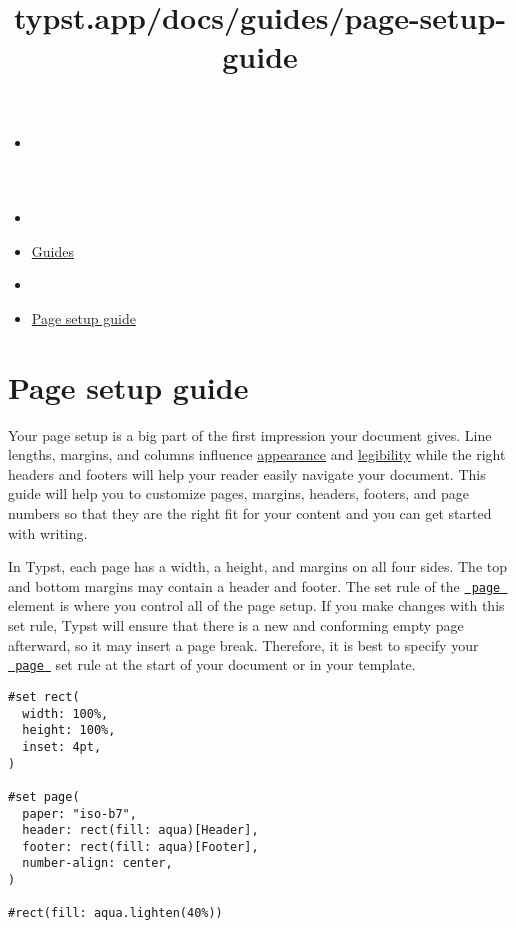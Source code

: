 \title{typst.app/docs/guides/page-setup-guide}

\begin{itemize}
\tightlist
\item
  \href{/docs}{}
\item
  
\item
  \href{/docs/guides/}{Guides}
\item
  
\item
  \href{/docs/guides/page-setup-guide/}{Page setup guide}
\end{itemize}

\section{Page setup guide}\label{page-setup-guide}

Your page setup is a big part of the first impression your document
gives. Line lengths, margins, and columns influence
\href{https://practicaltypography.com/page-margins.html}{appearance} and
\href{https://designregression.com/article/line-length-revisited-following-the-research}{legibility}
while the right headers and footers will help your reader easily
navigate your document. This guide will help you to customize pages,
margins, headers, footers, and page numbers so that they are the right
fit for your content and you can get started with writing.

In Typst, each page has a width, a height, and margins on all four
sides. The top and bottom margins may contain a header and footer. The
set rule of the \href{/docs/reference/layout/page/}{\texttt{\ page\ }}
element is where you control all of the page setup. If you make changes
with this set rule, Typst will ensure that there is a new and conforming
empty page afterward, so it may insert a page break. Therefore, it is
best to specify your
\href{/docs/reference/layout/page/}{\texttt{\ page\ }} set rule at the
start of your document or in your template.

\begin{verbatim}
#set rect(
  width: 100%,
  height: 100%,
  inset: 4pt,
)

#set page(
  paper: "iso-b7",
  header: rect(fill: aqua)[Header],
  footer: rect(fill: aqua)[Footer],
  number-align: center,
)

#rect(fill: aqua.lighten(40%))
\end{verbatim}

